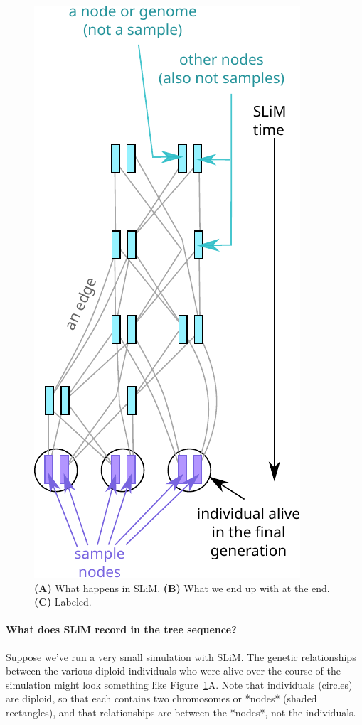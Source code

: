 \documentclass[12pt]{article}
\begin{document}
\begin{figure}
    \includegraphics{figures/pedigree2}
\caption{
    \textbf{(A)} What happens in SLiM.
    \textbf{(B)} What we end up with at the end.
    \textbf{(C)} Labeled.
}
\label{fig:indivs}
\end{figure}



\paragraph{What does SLiM record in the tree sequence?}
Suppose we've run a very small simulation with SLiM. The genetic relationships between
the various diploid individuals who were alive over the course of the simulation might
look something like Figure~\ref{fig:indivs}A.
Note that individuals (circles) are
diploid, so that each contains two chromosomes or *nodes* (shaded rectangles),
and that relationships are between the *nodes*, not the individuals.
\end{document}
